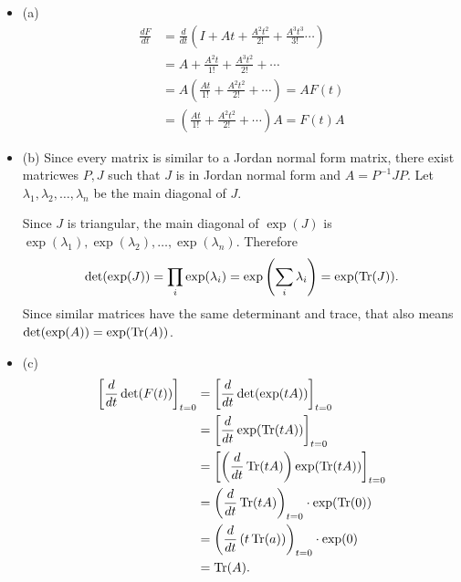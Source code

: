 \documentclass{article}
\begin{document}
\begin{itemize}
    \item (a)
        \begin{align*}
            \frac{dF}{dt} &= \frac{d}{dt} \left( I + At + \frac{A^2t^2}{2!} + \frac{A^3t^3}{3!} \cdots \right) \\
                          &= A + \frac{A^2t}{1!} + \frac{A^3t^2}{2!} + \cdots \\
                          &= A \left( \frac{At}{1!} + \frac{A^2t^2}{2!} + \cdots \right) = AF(t) \\
                          &= \left( \frac{At}{1!} + \frac{A^2t^2}{2!} + \cdots \right) A = F(t)A
        \end{align*}
    \item (b) Since every matrix is similar to a Jordan normal form matrix, there exist matricwes $P, J$ such that $J$ is in Jordan normal form and $A=P^{-1}JP$. Let $\lambda_1, \lambda_2, \dots, \lambda_n$ be the main diagonal of $J$.
        \par
        Since $J$ is triangular, the main diagonal of $\exp(J)$ is $\exp(\lambda_1), \exp(\lambda_2), \dots, \exp(\lambda_n)$. Therefore
        \[ \det(\exp(J)) = \prod_i \exp(\lambda_i) = \exp \left( \sum_i \lambda_i \right) = \exp(\operatorname{Tr}(J)). \]
        Since similar matrices have the same determinant and trace, that also means $\det(\exp(A))=\exp(\operatorname{Tr}(A))$.
    \item (c)
        \begin{align*}
            \left[ \frac{d}{dt} \det(F(t)) \right]_{t=0} &= \left[ \frac{d}{dt} \det(\exp(tA)) \right]_{t=0} \\
                                                         &= \left[ \frac{d}{dt} \exp(\operatorname{Tr}(tA)) \right]_{t=0} \\
                                                         &= \left[ \left( \frac{d}{dt} \operatorname{Tr}(tA) \right) \exp(\operatorname{Tr}(tA)) \right]_{t=0} \\
                                                         &= \left( \frac{d}{dt} \operatorname{Tr}(tA) \right)_{t=0} \cdot \exp(\operatorname{Tr}(0)) \\
                                                         &= \left( \frac{d}{dt} \left(t \operatorname{Tr}(a) \right) \right)_{t=0} \cdot \exp(0) \\
                                                         &= \operatorname{Tr}(A).
        \end{align*}
\end{itemize}
\end{document}
